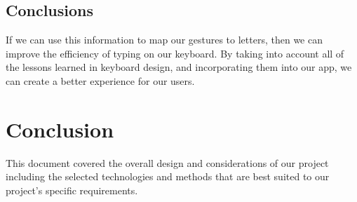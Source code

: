 \documentclass[onecolumn, draftclsnofoot,10pt, journal, letterpaper]{IEEEtran}
\begin{document}
    \subsection{Conclusions}
        If we can use this information to map our gestures to letters, then we can improve the efficiency of typing on our keyboard. By taking into account all of the lessons learned in keyboard design, and incorporating them into our app, we can create a better experience for our users.
        
\section{Conclusion}
    This document covered the overall design and considerations of our project including the selected technologies and methods that are best suited to our project's specific requirements. 

\newpage


    
\end{document}
